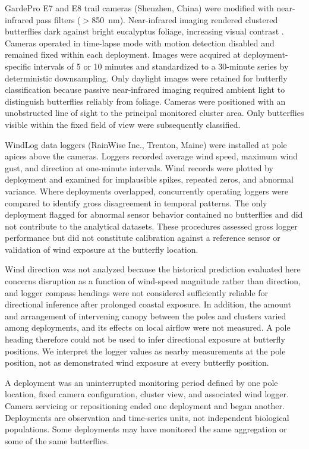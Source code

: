 \documentclass[insects,article,submit,pdftex,moreauthors]{Definitions/mdpi}
\begin{document}
GardePro E7 and E8 trail cameras (Shenzhen, China) were modified with near-infrared pass filters ($>$850~nm). Near-infrared imaging rendered clustered butterflies dark against bright eucalyptus foliage, increasing visual contrast \cite{gatesSpectralPropertiesPlants1965,hristovEstimatingOverwinteringMonarch2019,thajAnalysisOpticalProperties2025}. Cameras operated in time-lapse mode with motion detection disabled and remained fixed within each deployment. Images were acquired at deployment-specific intervals of 5 or 10 minutes and standardized to a 30-minute series by deterministic downsampling. Only daylight images were retained for butterfly classification because passive near-infrared imaging required ambient light to distinguish butterflies reliably from foliage. Cameras were positioned with an unobstructed line of sight to the principal monitored cluster area. Only butterflies visible within the fixed field of view were subsequently classified.

WindLog data loggers (RainWise Inc., Trenton, Maine) were installed at pole apices above the cameras. Loggers recorded average wind speed, maximum wind gust, and direction at one-minute intervals. Wind records were plotted by deployment and examined for implausible spikes, repeated zeros, and abnormal variance. Where deployments overlapped, concurrently operating loggers were compared to identify gross disagreement in temporal patterns. The only deployment flagged for abnormal sensor behavior contained no butterflies and did not contribute to the analytical datasets. These procedures assessed gross logger performance but did not constitute calibration against a reference sensor or validation of wind exposure at the butterfly location.

Wind direction was not analyzed because the historical prediction evaluated here concerns disruption as a function of wind-speed magnitude rather than direction, and logger compass headings were not considered sufficiently reliable for directional inference after prolonged coastal exposure. In addition, the amount and arrangement of intervening canopy between the poles and clusters varied among deployments, and its effects on local airflow were not measured. A pole heading therefore could not be used to infer directional exposure at butterfly positions. We interpret the logger values as nearby measurements at the pole position, not as demonstrated wind exposure at every butterfly position.

A deployment was an uninterrupted monitoring period defined by one pole location, fixed camera configuration, cluster view, and associated wind logger. Camera servicing or repositioning ended one deployment and began another. Deployments are observation and time-series units, not independent biological populations. Some deployments may have monitored the same aggregation or some of the same butterflies.
\end{document}
